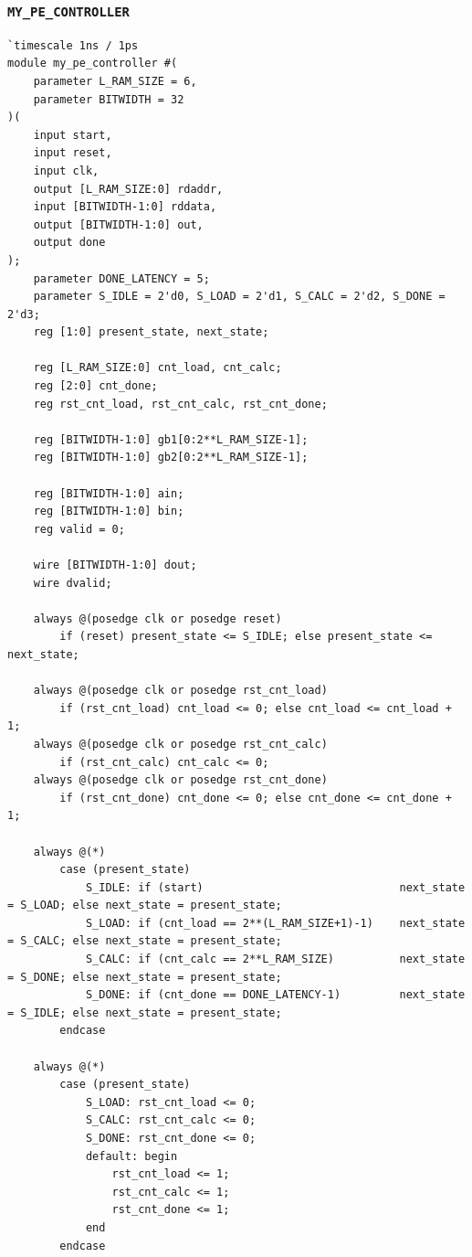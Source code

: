 \documentclass{article}
\begin{document}
\subsubsection*{\texttt{MY\_PE\_CONTROLLER}}
\begin{lstlisting}[style={verilog-style}]
`timescale 1ns / 1ps
module my_pe_controller #(
    parameter L_RAM_SIZE = 6,
    parameter BITWIDTH = 32
)(
    input start,
    input reset,
    input clk,
    output [L_RAM_SIZE:0] rdaddr,
    input [BITWIDTH-1:0] rddata,
    output [BITWIDTH-1:0] out,
    output done
);
    parameter DONE_LATENCY = 5;
    parameter S_IDLE = 2'd0, S_LOAD = 2'd1, S_CALC = 2'd2, S_DONE = 2'd3;
    reg [1:0] present_state, next_state;
    
    reg [L_RAM_SIZE:0] cnt_load, cnt_calc;
    reg [2:0] cnt_done;
    reg rst_cnt_load, rst_cnt_calc, rst_cnt_done;
    
    reg [BITWIDTH-1:0] gb1[0:2**L_RAM_SIZE-1];
    reg [BITWIDTH-1:0] gb2[0:2**L_RAM_SIZE-1];
    
    reg [BITWIDTH-1:0] ain;
    reg [BITWIDTH-1:0] bin;
    reg valid = 0;
    
    wire [BITWIDTH-1:0] dout;
    wire dvalid;
    
    always @(posedge clk or posedge reset)
        if (reset) present_state <= S_IDLE; else present_state <= next_state;
        
    always @(posedge clk or posedge rst_cnt_load) 
        if (rst_cnt_load) cnt_load <= 0; else cnt_load <= cnt_load + 1;
    always @(posedge clk or posedge rst_cnt_calc) 
        if (rst_cnt_calc) cnt_calc <= 0;
    always @(posedge clk or posedge rst_cnt_done) 
        if (rst_cnt_done) cnt_done <= 0; else cnt_done <= cnt_done + 1;
    
    always @(*)
        case (present_state)
            S_IDLE: if (start)                              next_state = S_LOAD; else next_state = present_state;
            S_LOAD: if (cnt_load == 2**(L_RAM_SIZE+1)-1)    next_state = S_CALC; else next_state = present_state;
            S_CALC: if (cnt_calc == 2**L_RAM_SIZE)          next_state = S_DONE; else next_state = present_state;
            S_DONE: if (cnt_done == DONE_LATENCY-1)         next_state = S_IDLE; else next_state = present_state;
        endcase
    
    always @(*)
        case (present_state)
            S_LOAD: rst_cnt_load <= 0;
            S_CALC: rst_cnt_calc <= 0;
            S_DONE: rst_cnt_done <= 0;
            default: begin
                rst_cnt_load <= 1; 
                rst_cnt_calc <= 1;
                rst_cnt_done <= 1;
            end
        endcase
        

\end{lstlisting}
\end{document}

